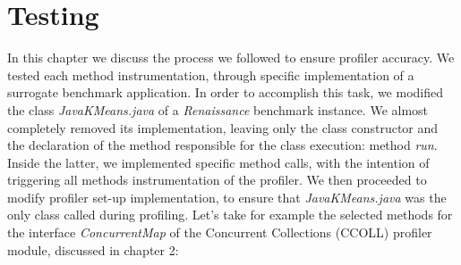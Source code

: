 \documentclass[]{usiinfthesis}
\begin{document}
\section{Testing}
In this chapter we discuss the process we followed to ensure profiler accuracy. We tested each method instrumentation, through specific implementation of a surrogate benchmark application. In order to accomplish this task, we modified the class \textit{JavaKMeans.java} of a \textit{Renaissance}  benchmark instance. We almost completely removed its implementation, leaving only the class constructor and the declaration of the method responsible for the class execution: method \textit{run}. Inside the latter, we implemented specific method calls, with the intention of triggering all methods instrumentation of the profiler. We then proceeded to modify profiler set-up implementation, to ensure that \textit{JavaKMeans.java} was the only class called during profiling.
\newline \newline
Let's take for example the selected methods for the interface \textit{ConcurrentMap} of the Concurrent Collections (CCOLL) profiler module, discussed in chapter 2:
\end{document}
